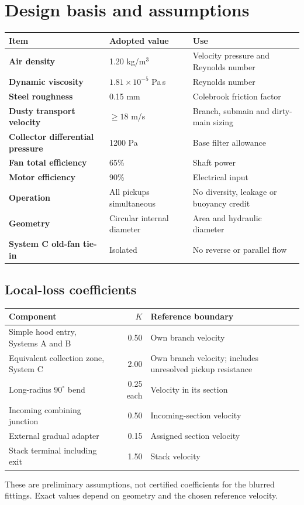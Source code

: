 \documentclass[11pt,a4paper]{article}
\begin{document}
\clearpage
\section{Design basis and assumptions}
\begin{tabularx}{\textwidth}{>{\bfseries}l l X}
\toprule
Item & Adopted value & Use\\
\midrule
Air density & 1.20 kg/m$^3$ & Velocity pressure and Reynolds number\\
Dynamic viscosity & $1.81\times10^{-5}$ Pa\,s & Reynolds number\\
Steel roughness & 0.15 mm & Colebrook friction factor\\
Dusty transport velocity & $\geq18$ m/s & Branch, submain and dirty-main sizing\\
Collector differential pressure & 1200 Pa & Base filter allowance\\
Fan total efficiency & 65\% & Shaft power\\
Motor efficiency & 90\% & Electrical input\\
Operation & All pickups simultaneous & No diversity, leakage or buoyancy credit\\
Geometry & Circular internal diameter & Area and hydraulic diameter\\
System C old-fan tie-in & Isolated & No reverse or parallel flow\\
\bottomrule
\end{tabularx}

\subsection{Local-loss coefficients}
\begin{tabularx}{\textwidth}{X r X}
\toprule
Component & $K$ & Reference boundary\\
\midrule
Simple hood entry, Systems A and B & 0.50 & Own branch velocity\\
Equivalent collection zone, System C & 2.00 & Own branch velocity; includes unresolved pickup resistance\\
Long-radius $90^\circ$ bend & 0.25 each & Velocity in its section\\
Incoming combining junction & 0.50 & Incoming-section velocity\\
External gradual adapter & 0.15 & Assigned section velocity\\
Stack terminal including exit & 1.50 & Stack velocity\\
\bottomrule
\end{tabularx}
These are preliminary assumptions, not certified coefficients for the blurred fittings. Exact values depend on geometry and the chosen reference velocity.
\end{document}
